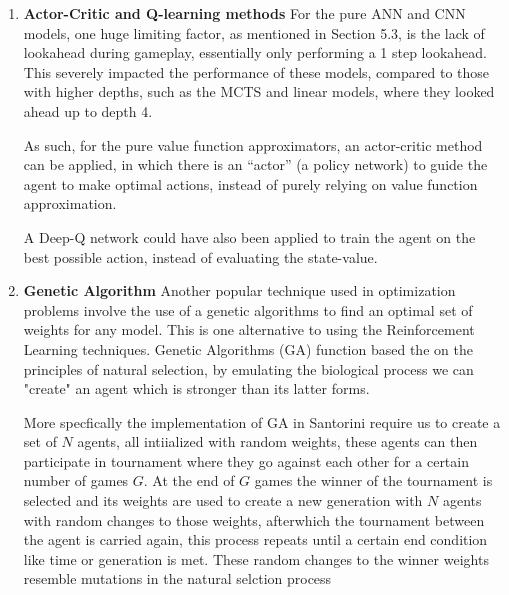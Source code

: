 \documentclass[a4paper,12pt,table]{article}
\begin{document}
\begin{enumerate}
    \item \textbf{Actor-Critic and Q-learning methods}
    \newline
    For the pure ANN and CNN models, one huge limiting factor, as mentioned in Section 5.3, is the lack of lookahead during gameplay, essentially only performing a 1 step lookahead. This severely impacted the performance of these models, compared to those with higher depths, such as the MCTS and linear models, where they looked ahead up to depth 4. \par

    As such, for the pure value function approximators, an actor-critic method can be applied, in which there is an “actor” (a policy network) to guide the agent to make optimal actions, instead of purely relying on value function approximation. \par

    A Deep-Q network could have also been applied to train the agent on the best possible action, instead of evaluating the state-value. \par

    \item \textbf{Genetic Algorithm}
    \newline
    Another popular technique used in optimization problems involve the use of a genetic algorithms to find an optimal set of weights for any model. This is one alternative to using the Reinforcement Learning techniques. Genetic Algorithms (GA) function based the on the principles of natural selection, by emulating the biological process we can "create" an agent which is stronger than its latter forms. \cite{Genetic algorithms: Concepts and Applications} \par

    More specfically the implementation of GA in Santorini require us to create a set of $N$ agents, all intiialized with random weights, these agents can then participate in tournament where they go against each other for a certain number of games $G$. At the end of $G$ games the winner of the tournament is selected and its weights are used to create a new generation with $N$ agents with random changes to those weights, afterwhich the tournament between the agent is carried again, this process repeats until a certain end condition like time or generation is met. These random changes to the winner weights resemble mutations in the natural selction process


\end{enumerate}
    
\end{document}
